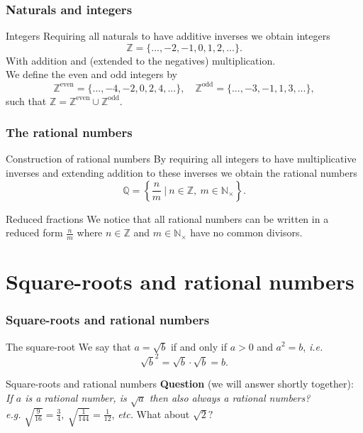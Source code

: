 \documentclass{beamer}[10]
\begin{document}
\begin{frame}
	\frametitle{Naturals and integers}
	\begin{block}{Integers}
		Requiring all naturals to have additive inverses we obtain integers\begin{equation}
		\mathbb{Z}=\{...,-2,-1,0,1,2,...\}.
		\end{equation}
		With addition and (extended to the negatives) multiplication.\\
		\pause
	We define the even and odd integers by \begin{equation}
	\mathbb{Z}^{\text{even}}=\{...,-4,-2,0,2,4,...\},\quad\mathbb{Z}^{\text{odd}}=\{...,-3,-1,1,3,...\},
				\end{equation}
				such that $ \mathbb{Z}=\mathbb{Z}^{\text{even}}\cup \mathbb{Z}^{\text{odd}} $.
	\end{block}
\end{frame}
\begin{frame}
	\frametitle{The rational numbers}
	\begin{block}{Construction of rational numbers}
		By requiring all integers to have multiplicative inverses and extending addition to these inverses we obtain the rational numbers \begin{equation}
		\mathbb{Q}=\left\{\frac{n}{m}\ \big\vert\ n\in\mathbb{Z},\ m\in\mathbb{N}_{\times}\right\}.
		\end{equation}
	\end{block}
	\begin{block}{Reduced fractions}
		We notice that all rational numbers can be written in a reduced form $ \frac{n}{m} $ where $ n\in\mathbb{Z} $ and $ m\in\mathbb{N}_{\times} $ have no common divisors. 
	\end{block}
\end{frame}
\section{Square-roots and rational numbers}
\begin{frame}
	\frametitle{Square-roots and rational numbers}
	\begin{block}{The square-root}
		We say that $ a=\sqrt{b} $ if and only if $ a>0 $ and $ a^2=b $, \emph{i.e.} \begin{equation}
		 \sqrt{b}^2=\sqrt{b}\cdot\sqrt{b}=b.
		\end{equation}
	\end{block}
	\begin{block}{Square-roots and rational numbers}
		\textbf{Question} (we will answer shortly together): \emph{If $ a $ is a rational number, is $ \sqrt{a} $ then also always a rational numbers?}\\
		\emph{e.g.} $ \sqrt{\frac{9}{16}}=\frac{3}{4},\ \sqrt{\frac{1}{144}}=\frac{1}{12} $, \emph{etc.} What about $ \sqrt{2}? $
	\end{block}
\end{frame}
\end{document}
